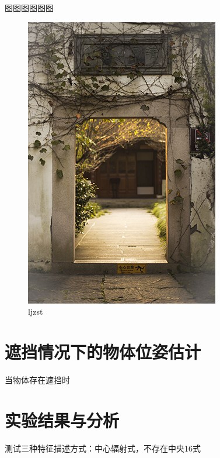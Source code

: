 图图图图图图
\begin{figure}[htb]
	\centering 
	\includegraphics[scale=1.0]{./Pictures/test.jpg} 
	\caption{ljzst} 
\end{figure}


\section{遮挡情况下的物体位姿估计} %

当物体存在遮挡时


\section{实验结果与分析} %


测试三种特征描述方式：中心辐射式，不存在中央16式
















